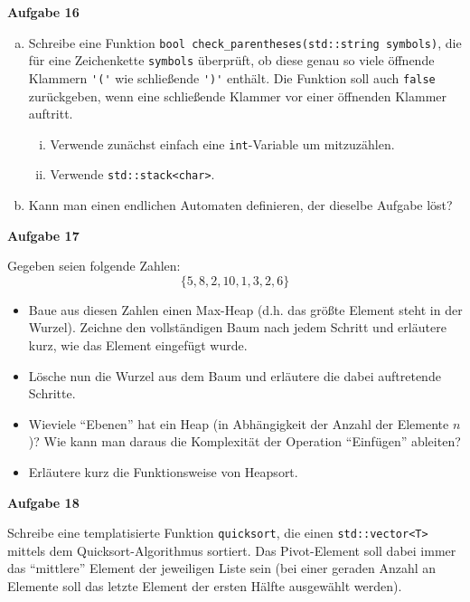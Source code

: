 \documentclass[a4paper,12pt]{article}
\newcommand{\Aufgabe}[1]{
  {
    \vspace*{0.5cm}
    \textsf{\textbf{Aufgabe #1}}
    \vspace*{0.2cm}
    
  }
}
\begin{document}
\Aufgabe{16}
\begin{enumerate}[a)]
\item Schreibe eine Funktion \lstinline{bool check_parentheses(std::string symbols)}, die für eine Zeichenkette
  \lstinline{symbols} überprüft, ob diese genau so viele öffnende
  Klammern \lstinline{'('} wie schließende \lstinline{')'}
  enthält. Die Funktion soll auch \lstinline{false} zurückgeben, wenn
  eine schließende Klammer vor einer öffnenden Klammer auftritt.
  \begin{enumerate}[i)]
  \item Verwende zunächst einfach eine \lstinline{int}-Variable um
    mitzuzählen.
  \item Verwende \lstinline{std::stack<char>}.
  \end{enumerate}
\item Kann man einen endlichen Automaten definieren, der dieselbe
  Aufgabe löst?
\end{enumerate}

\Aufgabe{17}
Gegeben seien folgende Zahlen: $$ \{ 5, 8, 2, 10, 1, 3, 2, 6 \}  $$
\begin{itemize}
\item Baue aus diesen Zahlen einen Max-Heap (d.h. das größte Element steht in der Wurzel). Zeichne den vollständigen Baum nach jedem Schritt und erläutere kurz, wie das Element eingefügt wurde.
\item Lösche nun die Wurzel aus dem Baum und erläutere die dabei auftretende Schritte.
\item Wieviele ``Ebenen'' hat ein Heap (in Abhängigkeit der Anzahl der Elemente $n$)? Wie kann man daraus die Komplexität der Operation ``Einfügen'' ableiten?
\item Erläutere kurz die Funktionsweise von Heapsort.
\end{itemize}

\Aufgabe{18}
Schreibe eine templatisierte Funktion \texttt{quicksort}, die einen \lstinline{std::vector<T>} mittels dem Quicksort-Algorithmus sortiert. Das Pivot-Element soll dabei immer das ``mittlere'' Element der jeweiligen Liste sein (bei einer geraden Anzahl an Elemente soll das letzte Element der ersten Hälfte ausgewählt werden).
\end{document}
